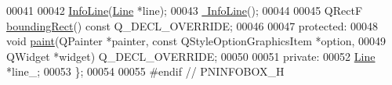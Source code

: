 \begin{DoxyCode}
00041 
00042   \hyperlink{class_info_line_a63819dbfeb257cc86be86f0fac3aa02f}{InfoLine}(\hyperlink{class_line}{Line} *line);
00043   \hyperlink{class_info_line_ac3497eeb5f2719fb4fac42434955597d}{~InfoLine}();
00044 
00045   QRectF \hyperlink{class_info_line_a3103eee5d5a8b4fd53d428f9aea01830}{boundingRect}() const Q\_DECL\_OVERRIDE;
00046 
00047 protected:
00048   \textcolor{keywordtype}{void} \hyperlink{class_info_line_ac696c9944716774dfe85a40ac5a434e1}{paint}(QPainter *painter, const QStyleOptionGraphicsItem *option,
00049              QWidget *widget) Q\_DECL\_OVERRIDE;
00050 
00051 private:
00052   \hyperlink{class_line}{Line} *line\_;
00053 \};
00054 
00055 \textcolor{preprocessor}{#endif  // PNINFOBOX\_H}
\end{DoxyCode}

